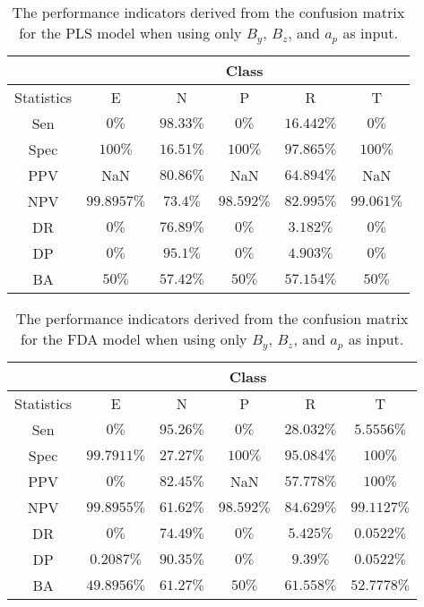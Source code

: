 \begin{table}[!ht]
	\centering
	\begin{tabular}{|c|c|c|c|c|c|}
		\hline
		 & \multicolumn{5}{c|}{Class} \\ \hline
		Statistics & E & N & P & R & T \\ \hline
		Sen & $0\%$ & $98.33\%$ & $0\%$ & $16.442\%$ & $0\%$ \\ \hline
		Spec & $100\%$ & $16.51\%$ & $100\%$ & $97.865\%$ & $100\%$ \\ \hline
		PPV & NaN & $80.86\%$ & NaN & $64.894\%$ & NaN \\ \hline
		NPV & $99.8957\%$ & $73.4\%$ & $98.592\%$ & $82.995\%$ & $99.061\%$ \\ \hline
		DR & $0\%$ & $76.89\%$ & $0\%$ & $3.182\%$ & $0\%$ \\ \hline
		DP & $0\%$ & $95.1\%$ & $0\%$ & $4.903\%$ & $0\%$ \\ \hline
		BA & $50\%$ & $57.42\%$ & $50\%$ & $57.154\%$ & $50\%$ \\ \hline
	\end{tabular}
	\caption{The performance indicators derived from the confusion matrix for the PLS model when using only $B_{y}$, $B_{z}$, and $a_{p}$ as input.}
	\label{tab:cs:reverse:yzap:pls}
\end{table}

\begin{table}[!ht]
	\centering
	\begin{tabular}{|c|c|c|c|c|c|}
		\hline
		 & \multicolumn{5}{c|}{Class} \\ \hline
		Statistics & E & N & P & R & T \\ \hline
		Sen & $0\%$ & $95.26\%$ & $0\%$ & $28.032\%$ & $5.5556\%$ \\ \hline
		Spec & $99.7911\%$ & $27.27\%$ & $100\%$ & $95.084\%$ & $100\%$ \\ \hline
		PPV & $0\%$ & $82.45\%$ & NaN & $57.778\%$ & $100\%$ \\ \hline
		NPV & $99.8955\%$ & $61.62\%$ & $98.592\%$ & $84.629\%$ & $99.1127\%$ \\ \hline
		DR & $0\%$ & $74.49\%$ & $0\%$ & $5.425\%$ & $0.0522\%$ \\ \hline
		DP & $0.2087\%$ & $90.35\%$ & $0\%$ & $9.39\%$ & $0.0522\%$ \\ \hline
		BA & $49.8956\%$ & $61.27\%$ & $50\%$ & $61.558\%$ & $52.7778\%$ \\ \hline
	\end{tabular}
	\caption{The performance indicators derived from the confusion matrix for the FDA model when using only $B_{y}$, $B_{z}$, and $a_{p}$ as input.}
	\label{tab:cs:reverse:yzap:fda}
\end{table}


